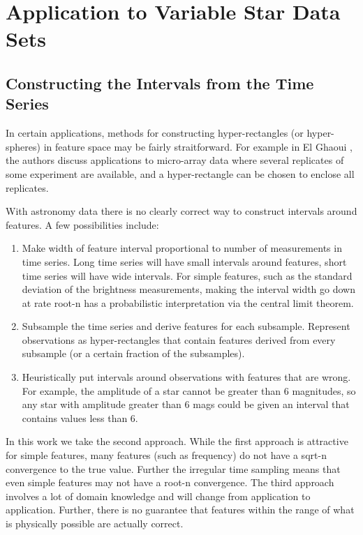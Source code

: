 \documentclass[10pt]{article}
\theoremstyle{definition}
\begin{document}
\section{Application to Variable Star Data Sets}
\subsection{Constructing the Intervals from the Time Series}
In certain applications, methods for constructing hyper-rectangles (or hyper-spheres) in feature space may be fairly straitforward. For example in El Ghaoui \cite{el2003robust}, the authors discuss applications to micro-array data where several replicates of some experiment are available, and a hyper-rectangle can be chosen to enclose all replicates.

With astronomy data there is no clearly correct way to construct intervals around features. A few possibilities include:
\begin{enumerate}
\item Make width of feature interval proportional to number of measurements in time series. Long time series will have small intervals around features, short time series will have wide intervals. For simple features, such as the standard deviation of the brightness measurements, making the interval width go down at rate root-n has a probabilistic interpretation via the central limit theorem.
\item Subsample the time series and derive features for each subsample. Represent observations as hyper-rectangles that contain features derived from every subsample (or a certain fraction of the subsamples).
\item Heuristically put intervals around observations with features that are wrong. For example, the amplitude of a star cannot be greater than 6 magnitudes, so any star with amplitude greater than 6 mags could be given an interval that contains values less than 6.
\end{enumerate}
In this work we take the second approach. While the first approach is attractive for simple features, many features (such as frequency) do not have a sqrt-n convergence to the true value. Further the irregular time sampling means that even simple features may not have a root-n convergence. The third approach involves a lot of domain knowledge and will change from application to application. Further, there is no guarantee that features within the range of what is physically possible are actually correct.
\end{document}
